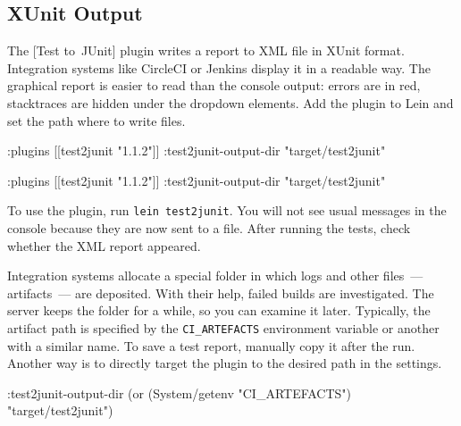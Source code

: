 \subsection{XUnit Output}


The [Test to~JUnit] plugin writes a report to XML file in XUnit format. Integration systems like CircleCI or Jenkins display it in a readable way. The graphical report is easier to read than the console output: errors are in red, stacktraces are hidden under the dropdown elements. Add the plugin to Lein and set the path where to write files.

\ifx\DEVICETYPE\MOBILE

\begin{english}
  \begin{clojure}
:plugins [[test2junit "1.1.2"]]
:test2junit-output-dir
  "target/test2junit"
  \end{clojure}
\end{english}

\else

\begin{english}
  \begin{clojure}
:plugins [[test2junit "1.1.2"]]
:test2junit-output-dir "target/test2junit"
  \end{clojure}
\end{english}

\fi

To use the plugin, run \verb|lein test2junit|. You will not see usual messages in the console because they are now sent to a file. After running the tests, check whether the XML report appeared.

Integration systems allocate a special folder in which logs and other files~--- artifacts~--- are deposited. With their help, failed builds are investigated. The server keeps the folder for a while, so you can examine it later. Typically, the artifact path is specified by the \verb|CI_ARTEFACTS| environment variable or another with a similar name. To save a test report, manually copy it after the run. Another way is to directly target the plugin to the desired path in the settings.

\ifx\DEVICETYPE\MOBILE

\begin{english}
  \begin{clojure}
:test2junit-output-dir
  (or (System/getenv "CI_ARTEFACTS")
      "target/test2junit")
  \end{clojure}
\end{english}

